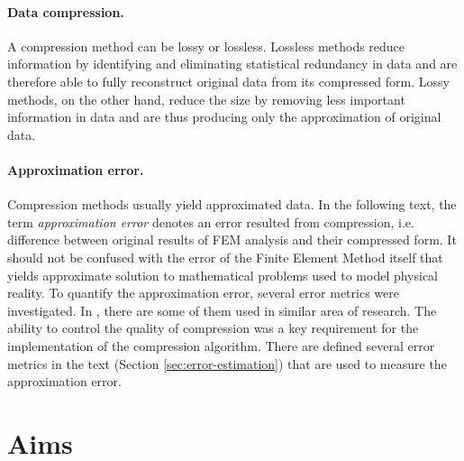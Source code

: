 \paragraph{Data compression.} A compression method can be lossy or lossless. Lossless methods reduce information by identifying and eliminating statistical redundancy in data and are therefore able to fully reconstruct original data from its compressed form. Lossy methods, on the other hand, reduce the size by removing less important information in data and are thus producing only the approximation of original data.

\paragraph{Approximation error.} Compression methods usually yield approximated data. In the following text, the term \textit{approximation error} denotes an error resulted from compression, i.e. difference between original results of FEM analysis and their compressed form. It should not be confused with the error of the Finite Element Method itself that yields approximate solution to mathematical problems used to model physical reality. To quantify the approximation error, several error metrics were investigated. In \cite{SairaBanu2015}, there are some of them used in similar area of research. The ability to control the quality of compression was a key requirement for the implementation of the compression algorithm. There are defined several error metrics in the text (Section \ref{sec:error-estimation}) that are used to measure the approximation error.




\section{Aims} %

